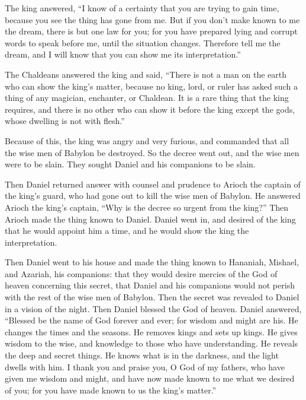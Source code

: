  The king answered, ``I know of a certainty that you are
trying to gain time, because you see the thing has gone from me.
 But if you don't make known to me the dream, there is but
one law for you; for you have prepared lying and corrupt words to speak
before me, until the situation changes. Therefore tell me the dream, and
I will know that you can show me its interpretation.''

 The Chaldeans answered the king and said, ``There is not
a man on the earth who can show the king's matter, because no king,
lord, or ruler has asked such a thing of any magician, enchanter, or
Chaldean.  It is a rare thing that the king requires, and
there is no other who can show it before the king except the gods, whose
dwelling is not with flesh.''

 Because of this, the king was angry and very furious,
and commanded that all the wise men of Babylon be destroyed.
 So the decree went out, and the wise men were to be
slain. They sought Daniel and his companions to be slain.

 Then Daniel returned answer with counsel and prudence to
Arioch the captain of the king's guard, who had gone out to kill the
wise men of Babylon.  He answered Arioch the king's
captain, ``Why is the decree so urgent from the king?'' Then Arioch made
the thing known to Daniel.  Daniel went in, and desired
of the king that he would appoint him a time, and he would show the king
the interpretation.

 Then Daniel went to his house and made the thing known
to Hananiah, Mishael, and Azariah, his companions:  that
they would desire mercies of the God of heaven concerning this secret,
that Daniel and his companions would not perish with the rest of the
wise men of Babylon.  Then the secret was revealed to
Daniel in a vision of the night. Then Daniel blessed the God of heaven.
 Daniel answered, ``Blessed be the name of God forever
and ever; for wisdom and might are his.  He changes the
times and the seasons. He removes kings and sets up kings. He gives
wisdom to the wise, and knowledge to those who have understanding.
 He reveals the deep and secret things. He knows what is
in the darkness, and the light dwells with him.  I thank
you and praise you, O God of my fathers, who have given me wisdom and
might, and have now made known to me what we desired of you; for you
have made known to us the king's matter.''

